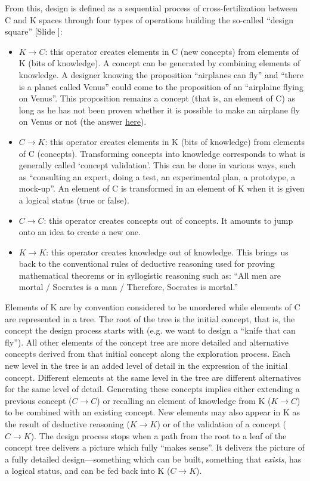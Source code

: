 \documentclass{article}
\newcounter{slide}
\begin{document}
From this, design is defined as a sequential process of cross-fertilization between C and K spaces through four types of operations building the so-called ``design square'' {\color{blue}[Slide ]}:
\begin{itemize}
	\item $K\rightarrow C$: this operator creates elements in C (new concepts) from elements of K (bits of knowledge). A concept can be generated by combining elements of knowledge. A designer knowing the proposition ``airplanes can fly'' and ``there is a planet called Venus'' could come to the proposition of an ``airplaine flying on Venus''. This proposition remains a concept (that is, an element of C) as long as he has not been proven whether it is possible to make an airplane fly on Venus or not (the answer \href{https://whatif.xkcd.com/book/}{here}).
	\item $C\rightarrow K$: this operator creates elements in K (bits of knowledge) from elements of C (concepts). Transforming concepts into knowledge corresponds to what is generally called `concept validation'. This can be done in various ways, such as ``consulting an expert, doing a test, an experimental plan, a prototype, a mock-up''. An element of C is transformed in an element of K when it is given a logical status (true or false).
	\item $C\rightarrow C$: this operator creates concepts out of concepts. It amounts to jump onto an idea to create a new one.
	\item $K\rightarrow K$: this operator creates knowledge out of knowledge. This brings us back to the conventional rules of deductive reasoning used for proving mathematical theorems or in syllogistic reasoning such as: ``All men are mortal / Socrates is a man / Therefore, Socrates is mortal.'' 
\end{itemize}

Elements of K are by convention considered to be unordered while elements of C are represented in a tree. The root of the tree is the initial concept, that is, the concept the design process starts with (e.g. we want to design a ``knife that can fly''). All other elements of the concept tree are more detailed and alternative concepts derived from that initial concept along the exploration process. Each new level in the tree is an added level of detail in the expression of the initial concept. Different elements at the same level in the tree are different alternatives for the same level of detail. Generating these concepts implies either extending a previous concept ($C\rightarrow C$) or recalling an element of knowledge from K ($K\rightarrow C$) to be combined with an existing concept. New elements may also appear in K as the result of deductive reasoning ($K\rightarrow K$) or of the validation of a concept ($C\rightarrow K$).  The design process stops when a path from the root to a leaf of the concept tree delivers a picture which fully ``makes sense''. It delivers the picture of a fully detailed design---something which can be built, something that \emph{exists}, has a logical status, and can be fed back into K ($C\rightarrow K$).
\end{document}
